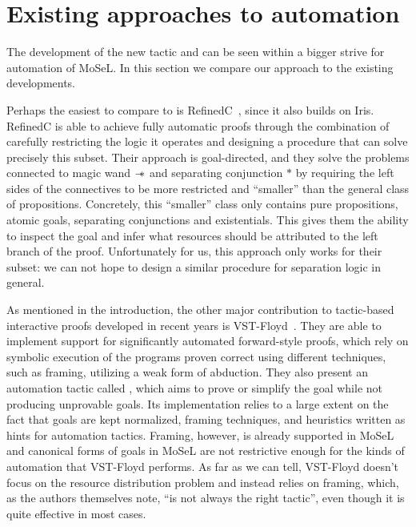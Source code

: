 \section{Existing approaches to automation}
\label{sec:exist-appr-autom}

The development of the new  tactic and  can be seen within a bigger strive for automation of MoSeL.
In this section we compare our approach to the existing developments.

Perhaps the easiest to compare to is RefinedC~\cite{sammlerRefinedCExtensibleRefinement2020}, since it also builds on Iris.
  RefinedC is able to achieve fully automatic proofs through the combination of carefully restricting the logic it operates and designing a procedure that can solve precisely this subset.
  Their approach is goal-directed, and they solve the problems connected to magic wand \(\mathrel{-\mkern-6mu*}\) and separating conjunction \(*\) by requiring the left sides of the connectives to be more restricted and ``smaller'' than the general class of propositions.
  Concretely, this ``smaller'' class only contains pure propositions, atomic goals, separating conjunctions and existentials.
  This gives them the ability to inspect the goal and infer what resources should be attributed to the left branch of the proof.
  Unfortunately for us, this approach only works for their subset: we can not hope to design a similar procedure for separation logic in general.

  As mentioned in the introduction, the other major contribution to tactic-based interactive proofs developed in recent years is VST-Floyd~\cite{caoVSTFloydSeparationLogic2018}.
  They are able to implement support for significantly automated forward-style proofs, which rely on symbolic execution of the programs proven correct using different techniques, such as framing, utilizing a weak form of abduction.
  They also present an automation tactic called , which aims to prove or simplify the goal while not producing unprovable goals.
  Its implementation relies to a large extent on the fact that goals are kept normalized, framing techniques, and heuristics written as hints for automation tactics.
  Framing, however, is already supported in MoSeL and canonical forms of goals in MoSeL are not restrictive enough for the kinds of automation that VST-Floyd performs.
  As far as we can tell, VST-Floyd doesn't focus on the resource distribution problem and instead relies on framing, which, as the authors themselves note, ``is not always the right tactic'', even though it is quite effective in most cases.

